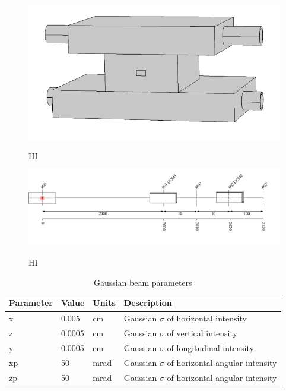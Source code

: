 \documentclass[preprint]{iucr}              %
\begin{document}
\begin{figure}
\caption{HI}
\includegraphics{images/nanomaxcomsol.png}
\label{fig:nanomaxcomsol}
\end{figure}


\begin{figure}
\caption{HI}
\includegraphics{images/gaussian_beamline.png}
\label{fig:dcmtracing}
\end{figure}


\begin{table}\label{gaussian}
\caption{Gaussian beam parameters}
\begin{tabular}{@{}llll@{}}
\toprule
Parameter       & Value         & Units     & Description                                          \\
\hline
x               & 0.005         & cm        & Gaussian $\sigma$ of horizontal intensity            \\
z               & 0.0005        & cm        & Gaussian $\sigma$ of vertical intensity              \\ 
y               & 0.0005        & cm        & Gaussian $\sigma$ of longitudinal intensity          \\
xp              & 50            & mrad      & Gaussian $\sigma$ of horizontal angular intensity    \\
zp              & 50            & mrad      & Gaussian $\sigma$ of horizontal angular intensity    \\

\end{tabular}
\end{table}
\end{document}
